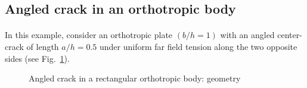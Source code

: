 \subsection{Angled crack in an orthotropic body}

\paragraph{}
In this example, consider an orthotropic plate $(b/h = 1)$ with an angled center-crack of length $a/h = 0.5$ under uniform far field tension along the two opposite sides (see Fig.~\ref{iso_fig:angled_crack_geo_bc}). 
    \begin{figure}
        \centering
        \caption{Angled crack in a rectangular orthotropic body: geometry}
        \label{iso_fig:angled_crack_geo_bc}
    \end{figure}

